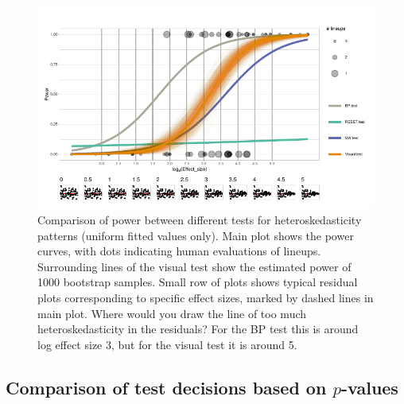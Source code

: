 \documentclass[]{interact}
\theoremstyle{plain}%
\theoremstyle{definition}
\theoremstyle{remark}
\begin{document}
\begin{figure}

{\centering \includegraphics[width=1\linewidth]{paper_comparison_files/figure-latex/heterpower-1} 

}

\caption{Comparison of power between different tests for heteroskedasticity patterns (uniform fitted values only). Main plot shows the power curves, with dots indicating human evaluations of lineups. Surrounding lines of the visual test show the estimated power of 1000 bootstrap samples. Small row of plots shows typical residual plots corresponding to specific effect sizes, marked by dashed lines in main plot. Where would you draw the line of too much heteroskedasticity in the residuals? For the BP test this is around log effect size 3, but for the visual test it is around 5.}\label{fig:heterpower}
\end{figure}

\hypertarget{comparison-of-test-decisions-based-on-p-values}{%
\subsection{\texorpdfstring{Comparison of test decisions based on
\(p\)-values}{Comparison of test decisions based on p-values}}\label{comparison-of-test-decisions-based-on-p-values}}
\end{document}
